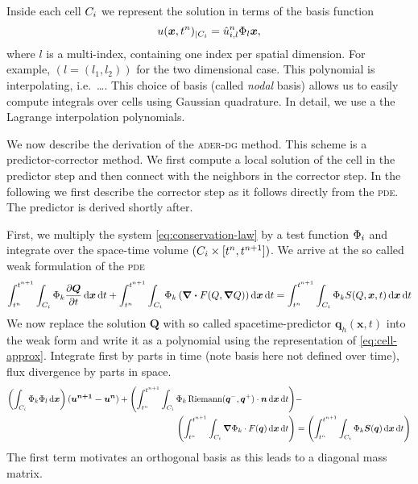Inside each cell $C_{i}$ we represent the solution in terms of the basis function 
\begin{equation}
  \label{eq:cell-approx}
  u(\bm{x}, t^n)_{|\cell[i]} = \hat{u}^n_{i,l} \sbasis{l}{\bm{x}},
\end{equation}
where $l$ is a multi-index, containing one index per spatial dimension.
For example, $(l = (l_1, l_2))$ for the two dimensional case.
This polynomial is interpolating, i.e.\ \ldots{}.
This choice of basis (called \textit{nodal} basis) allows us to easily compute integrals over cells using Gaussian quadrature.
In detail, we use a the Lagrange interpolation polynomials.

We now describe the derivation of the \textsc{ader-dg} method.
This scheme is a predictor-corrector method.
We first compute a local solution of the cell in the predictor step and then connect with the neighbors in the corrector step.
In the following we first describe the corrector step as it follows directly from the \textsc{pde}.
The predictor is derived shortly after.

First, we multiply the system \cref{eq:conservation-law} by a test function $\Phi_{i}$ and integrate over the space-time volume $(C_{i} \times [t^n, t^{n+1}])$.
We arrive at the so called weak formulation of the \textsc{pde} 
\newcommand{\intdt}[1]{\int_{t^n}^{t^{n+1}} #1 \dd{t}}
\newcommand{\intdcell}[1]{\int_{\cell} #1 \dd{\bm{x}}}
\newcommand{\intdcellb}[1]{\int_{\partial{} \cell} #1 \dd{S}} %
\begin{equation}
  \label{eq:weak-pde}
\intdt{\intdcell{
\testfunction{k} \pdv{\bm{Q}}{t}
}}
+
\intdt{\intdcell{
    \testfunction{k} \left( \div{F(Q, \gradient{Q})} \right)
}}
=
\intdt{\intdcell{
    \testfunction{k} S(Q, \bm{x}, t)
}}
\end{equation}
\newcommand{\stpredictor}[1]{\bm{q}_{#1}}
We now replace the solution $\bm{Q}$ with so called spacetime-predictor $\stpredictor{h}(\bm{x},t)$ into the weak form and write it as a polynomial using the representation of \cref{eq:cell-approx}.
Integrate first by parts in time (note basis here not defined over time), flux divergence by parts in space.
\begin{align}
\begin{split}
\label{eq:corrector}
\left(
\intdcell{
  \testfunction{k} \sbasis{l}
}
\right)
(\bm{u^{n+1} - u^{n}})
+
\left(\intdt{\intdcell{
      \testfunction{k} \Riemann(\bm{q}^-, \bm{q}^+) \cdot \normal
}}\right)
&-\\
\left(\intdt{\intdcell{
    \gradient{\testfunction{k}} \cdot  F(\bm{q})
}}\right)
&=
\left(\intdt{\intdcell{
      \testfunction{k} \source(\bm{q})
}}\right)
\end{split}
\end{align}
The first term motivates an orthogonal basis as this leads to a diagonal mass matrix.

